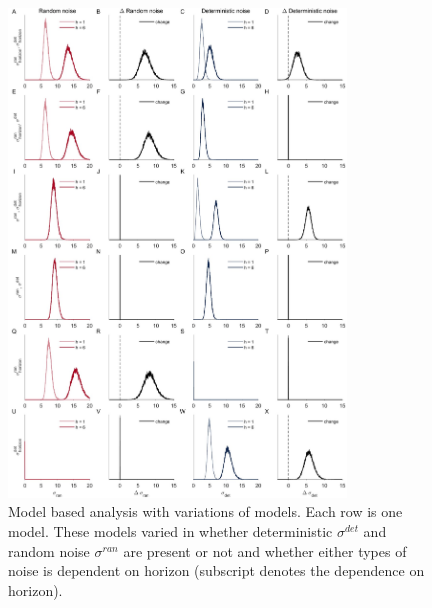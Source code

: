 \documentclass[12pt]{article}
\begin{document}
	
	\begin{figure}[hp]
		\begin{center}
			\includegraphics[width=0.8\textwidth]{figures/RDBayes_2noise_hyperpriors_6model.jpg}
			\caption{Model based analysis with variations of models. Each row is one model.  These models varied in whether deterministic $\sigma^{det}$ and random noise $\sigma^{ran}$ are present or not and whether either types of noise is dependent on horizon (subscript denotes the dependence on horizon). }
			\label{fig:s9}
		\end{center}
	\end{figure}


	\newpage
\end{document}
